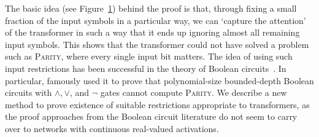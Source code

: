 \documentclass[11pt,a4paper]{article}
\begin{document}
\begin{figure}[ht]
	\label{fig:depth-reduction}
\end{figure}


The basic idea (see Figure~\ref{fig:depth-reduction}) behind the proof is that, through fixing a small fraction of the input symbols in a particular way, we can `capture the attention' of the transformer in such a way that it ends up ignoring almost all remaining input symbols.
This shows that the transformer could not have solved a problem such as \textsc{Parity}, where every single input bit matters.
The idea of using such input restrictions has been successful in the theory of Boolean circuits~\cite{furst1984parity,yao1986separating,hastad1994optimal}.
In particular, \citet{furst1984parity}  famously used it to prove that polynomial-size bounded-depth Boolean circuits with $\wedge, \vee$, and $\neg$ gates cannot compute \textsc{Parity}.
We describe a new method to prove existence of suitable restrictions appropriate to transformers, as the proof approaches from the Boolean circuit literature do not seem to carry over to networks with continuous real-valued activations. %




\end{document}
